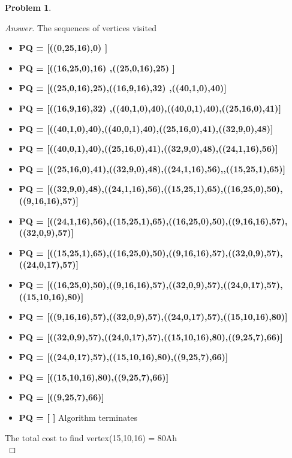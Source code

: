 \documentclass[11pt]{article}
\theoremstyle{definition}
\theoremstyle{definition}
\newtheorem{required}{Problem}
\theoremstyle{definition}
\begin{document}
\begin{required}
\begin{enumerate}[label=(\alph*)]
\begin{proof}[Answer]
The sequences of vertices visited
\begin{itemize}
\item \textbf{PQ = [((0,25,16),0) ] }
\item \textbf{PQ = [((16,25,0),16) ,((25,0,16),25)  ] }
\item \textbf{PQ = [((25,0,16),25),((16,9,16),32) ,((40,1,0),40)] }
\item \textbf{PQ = [((16,9,16),32) ,((40,1,0),40),((40,0,1),40),((25,16,0),41)] }
\item \textbf{PQ = [((40,1,0),40),((40,0,1),40),((25,16,0),41),((32,9,0),48)] }
\item \textbf{PQ = [((40,0,1),40),((25,16,0),41),((32,9,0),48),((24,1,16),56)] }
\item \textbf{PQ = [((25,16,0),41),((32,9,0),48),((24,1,16),56),,((15,25,1),65)] }
\item \textbf{PQ = [((32,9,0),48),((24,1,16),56),((15,25,1),65),((16,25,0),50),((9,16,16),57)]}
\item \textbf{PQ = [((24,1,16),56),((15,25,1),65),((16,25,0),50),((9,16,16),57),((32,0,9),57)]}
\item \textbf{PQ = [((15,25,1),65),((16,25,0),50),((9,16,16),57),((32,0,9),57),((24,0,17),57)]}
\item \textbf{PQ = [((16,25,0),50),((9,16,16),57),((32,0,9),57),((24,0,17),57),((15,10,16),80)]}
\item \textbf{PQ = [((9,16,16),57),((32,0,9),57),((24,0,17),57),((15,10,16),80)]}
\item \textbf{PQ = [((32,0,9),57),((24,0,17),57),((15,10,16),80),((9,25,7),66)]}
\item \textbf{PQ = [((24,0,17),57),((15,10,16),80),((9,25,7),66)]}
\item \textbf{PQ = [((15,10,16),80),((9,25,7),66)]}
\item \textbf{PQ = [((9,25,7),66)]}
\item \textbf{PQ = [ ]} Algorithm terminates
\end{itemize}
The total cost to find vertex(15,10,16) = 80Ah\\


\end{proof}
\end{enumerate}
\end{required}
\end{document}
